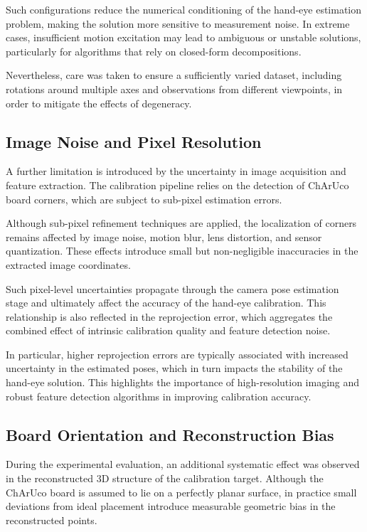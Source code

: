 Such configurations reduce the numerical conditioning of the hand-eye estimation problem, making the solution more sensitive to measurement noise. In extreme cases, insufficient motion excitation may lead to ambiguous or unstable solutions, particularly for algorithms that rely on closed-form decompositions.

Nevertheless, care was taken to ensure a sufficiently varied dataset, including rotations around multiple axes and observations from different viewpoints, in order to mitigate the effects of degeneracy.

\subsection{Image Noise and Pixel Resolution}
\label{sec:image_noise_resolution}

A further limitation is introduced by the uncertainty in image acquisition and feature extraction. The calibration pipeline relies on the detection of ChArUco board corners, which are subject to sub-pixel estimation errors.

Although sub-pixel refinement techniques are applied, the localization of corners remains affected by image noise, motion blur, lens distortion, and sensor quantization. These effects introduce small but non-negligible inaccuracies in the extracted image coordinates.

Such pixel-level uncertainties propagate through the camera pose estimation stage and ultimately affect the accuracy of the hand-eye calibration. This relationship is also reflected in the reprojection error, which aggregates the combined effect of intrinsic calibration quality and feature detection noise.

In particular, higher reprojection errors are typically associated with increased uncertainty in the estimated poses, which in turn impacts the stability of the hand-eye solution. This highlights the importance of high-resolution imaging and robust feature detection algorithms in improving calibration accuracy.





\subsection{Board Orientation and Reconstruction Bias}
\label{sec:board_orientation_bias}

During the experimental evaluation, an additional systematic effect was observed in the reconstructed 3D structure of the calibration target. Although the ChArUco board is assumed to lie on a perfectly planar surface, in practice small deviations from ideal placement introduce measurable geometric bias in the reconstructed points.

